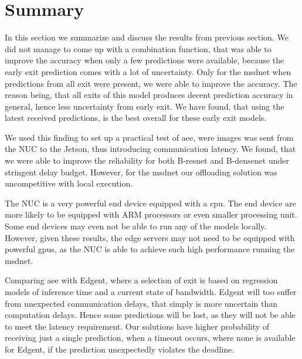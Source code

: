 \section{Summary} \label{sec:edge-summary}

In this section we summarize and discuss the results from previous section. We did not manage to come up with a combination function, that was able to improve the accuracy when only a few predictions were available, because the early exit prediction comes with a lot of uncertainty. Only for the \gls{msdnet} when predictions from all exit were present, we were able to improve the accuracy. The reason being, that all exits of this model produces decent prediction accuracy in general, hence less uncertainty from early exit. We have found, that using the latest received predictions, is the best overall for these early exit models.

We used this finding to set up a practical test of \gls{aee}, were images was sent from the NUC to the Jetson, thus introducing communication latency. We found, that we were able to improve the reliability for both B-\gls{resnet} and B-\gls{densenet} under stringent delay budget. However, for the \gls{msdnet} our offloading solution was uncompetitive with local execution. 

The NUC is a very powerful end device equipped with a \gls{cpu}. The end device are more likely to be equipped with ARM processors or even smaller processing unit. Some end devices may even not be able to run any of the models locally. However, given these results, the edge servers may not need to be equipped with powerful \gls{gpu}s, as the NUC is able to achieve such high performance running the \gls{msdnet}.

Comparing \gls{aee} with Edgent, where a selection of exit is based on regression models of inference time and a current state of bandwidth. Edgent will too suffer from unexpected communication delays, that simply is more uncertain than computation delays. Hence some predictions will be lost, as they will not be able to meet the latency requirement. Our solutions have higher probability of receiving just a single prediction, when a timeout occurs, where none is available for Edgent, if the prediction unexpectedly violates the deadline. 


